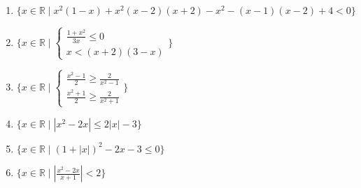 \documentclass[11pt,a4paper]{article}
\begin{document}
\begin{enumerate}
\item $\displaystyle \{x \in \mathbb{R} \mid x^{2}(1 - x) + x^{2}(x - 2)(x + 2) - x^{2} - (x - 1)(x - 2) + 4 < 0\}$
\item $\displaystyle \{x \in \mathbb{R} \mid \begin{cases} \frac{1 + x^{2}}{3x} \le 0 \\ x < (x + 2)(3 - x) \end{cases}\}$
\item $\displaystyle \{x \in \mathbb{R} \mid \begin{cases} \frac{x^{2} - 1}{2} \ge \frac{2}{x^{2} - 1} \\ \frac{x^{2} + 1}{2} \ge \frac{2}{x^{2} + 1} \end{cases}\}$
\item $\displaystyle \{x \in \mathbb{R} \mid \left|x^{2} - 2x\right| \le 2\left|x\right| - 3\}$
\item $\displaystyle \{x \in \mathbb{R} \mid (1 + \left|x\right|)^{2} - 2x - 3 \le 0\}$
\item $\displaystyle \{x \in \mathbb{R} \mid \left|\frac{x^{2} - 2x}{x + 1}\right| < 2\}$
\end{enumerate}
\end{document}
